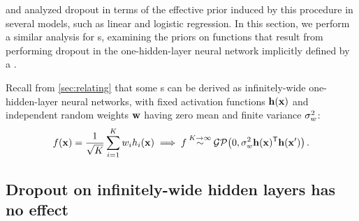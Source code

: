 \citet{baldi2013understanding} and \citet{wang2013fast} analyzed dropout in terms of the effective prior induced by this procedure in several models, such as linear and logistic regression.
In this section, we perform a similar analysis for \gp{}s, examining the priors on functions that result from performing dropout in the one-hidden-layer neural network implicitly defined by a \gp{}.

Recall from \cref{sec:relating} that some \gp{}s can be derived as infinitely-wide one-hidden-layer neural networks, with fixed activation functions ${\bf{h}}({\bf{x}})$ and independent random weights ${\bf{w}}$ having zero mean and finite variance $\sigma^2_{w}$:
%
\begin{align}
f({\bf{x}}) 
= \frac{1}{\sqrt{K}} \sum_{i=1}^K w_i h_i({\bf{x}})
\implies f \mathbin{\overset{K \to \infty}{\sim}} \mathcal{GP}\!\left(0,\sigma^2_{w} {\bf{h}}({\bf{x}})^{\mathsf{T}}{\bf{h}}({\bf{x}}')\right) .
\label{eq:one-layer-gp-two}
\end{align}
%



\subsection{Dropout on infinitely-wide hidden layers has no effect}

